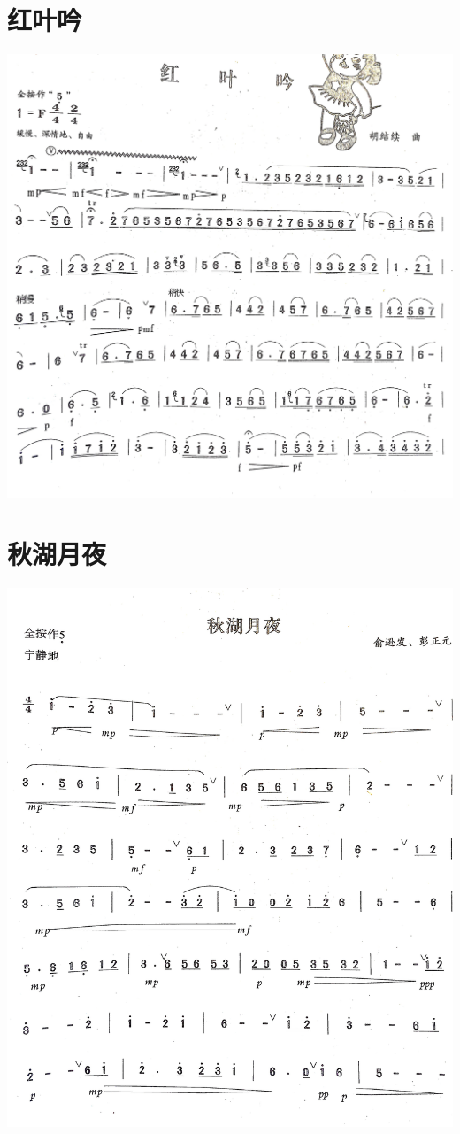 \documentclass[cn,pad,chinese,chinesefont=nofont]{elegantbook}
\begin{document}
\section{红叶吟}   
	\includegraphics[width=\textwidth]{dongxiao/IMG_0947.jpg}
\section{秋湖月夜}   
	\includegraphics[width=\textwidth]{dongxiao/IMG_0948.jpg}
\end{document}
